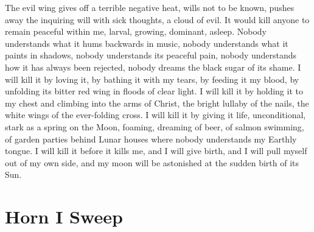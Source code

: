 \documentclass[english,11pt,letterpaper,onecolumn]{scrbook}
\begin{document}
\begin{poem}
\begin{stanza}
The evil wing gives off a terrible negative heat, wills not to be known, pushes away the inquiring will with sick thoughts, a cloud of evil.\verseline
It would kill anyone to remain peaceful within me, larval, growing, dominant, asleep.\verseline
Nobody understands what it hums backwards in music, nobody understands what it paints in shadows, nobody understands its peaceful pain, nobody understands how it has always been rejected, nobody dreams the black sugar of its shame.\verseline
I will kill it by loving it, by bathing it with my tears, by feeding it my blood, by unfolding its bitter red wing in floods of clear light.\verseline
I will kill it by holding it to my chest and climbing into the arms of Christ, the bright lullaby of the nails, the white wings of the ever-folding cross.\verseline
I will kill it by giving it life, unconditional, stark as a spring on the Moon, foaming, dreaming of beer, of salmon swimming, of garden parties behind Lunar houses where nobody understands my Earthly tongue.\verseline
I will kill it before it kills me, and I will give birth, and I will pull myself out of my own side, and my moon will be astonished at the sudden birth of its Sun.
\end{stanza}
\end{poem}

\newpage
\section{Horn I Sweep}
\end{document}
